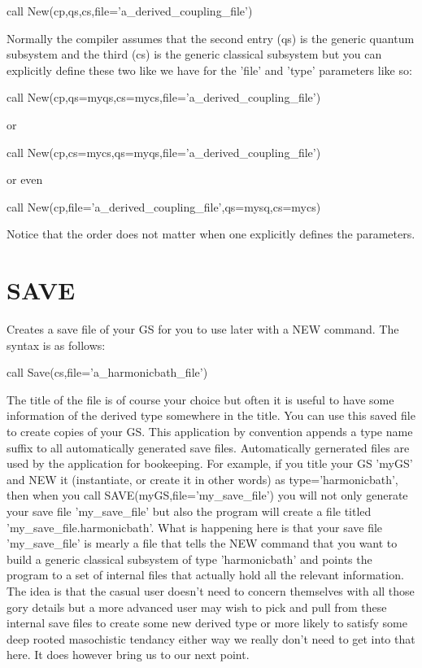  \par
 call New(cp,qs,cs,file='a\-\_\-derived\-\_\-coupling\-\_\-file')\par
 \par
 Normally the compiler assumes that the second entry (qs) is the generic quantum subsystem and the third (cs) is the generic classical subsystem but you can explicitly define these two like we have for the 'file' and 'type' parameters like so\-:\par
 \par
 call New(cp,qs=myqs,cs=mycs,file='a\-\_\-derived\-\_\-coupling\-\_\-file')\par
 or\par
 call New(cp,cs=mycs,qs=myqs,file='a\-\_\-derived\-\_\-coupling\-\_\-file')\par
 or even\par
 call New(cp,file='a\-\_\-derived\-\_\-coupling\-\_\-file',qs=mysq,cs=mycs)\par
 \par
 Notice that the order does not matter when one explicitly defines the parameters.\par
 \hypertarget{_interface_SAVE}{}\section{S\-A\-V\-E}\label{_interface_SAVE}
Creates a save file of your G\-S for you to use later with a N\-E\-W command. The syntax is as follows\-:\par
 \par
 call Save(cs,file='a\-\_\-harmonicbath\-\_\-file')\par
 \par
 The title of the file is of course your choice but often it is useful to have some information of the derived type somewhere in the title. You can use this saved file to create copies of your G\-S. This application by convention appends a type name suffix to all automatically generated save files. Automatically gernerated files are used by the application for bookeeping. For example, if you title your G\-S 'my\-G\-S' and N\-E\-W it (instantiate, or create it in other words) as type='harmonicbath', then when you call S\-A\-V\-E(my\-G\-S,file='my\-\_\-save\-\_\-file') you will not only generate your save file 'my\-\_\-save\-\_\-file' but also the program will create a file titled 'my\-\_\-save\-\_\-file.\-harmonicbath'. What is happening here is that your save file 'my\-\_\-save\-\_\-file' is mearly a file that tells the N\-E\-W command that you want to build a generic classical subsystem of type 'harmonicbath' and points the program to a set of internal files that actually hold all the relevant information. The idea is that the casual user doesn't need to concern themselves with all those gory details but a more advanced user may wish to pick and pull from these internal save files to create some new derived type or more likely to satisfy some deep rooted masochistic tendancy either way we really don't need to get into that here. It does however bring us to our next point.\par
